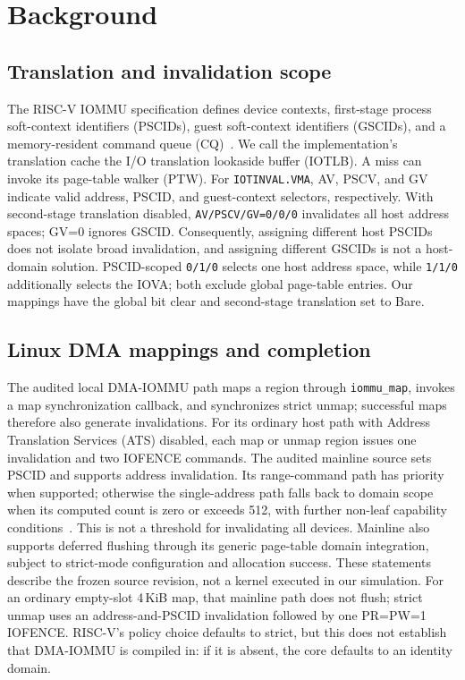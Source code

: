 \documentclass[sigconf,nonacm]{acmart}
\newcommand{\claim}[1]{} %
\begin{document}
\section{Background}
\subsection{Translation and invalidation scope}
The RISC-V IOMMU specification defines device contexts, first-stage process soft-context identifiers (PSCIDs), guest soft-context identifiers (GSCIDs), and a memory-resident command queue (CQ)~\cite{riscv_iommu_spec2026}.\claim{C022}
We call the implementation's translation cache the I/O translation lookaside buffer (IOTLB). A miss can invoke its page-table walker (PTW).\claim{C023}
For \texttt{IOTINVAL.VMA}, AV, PSCV, and GV indicate valid address, PSCID, and guest-context selectors, respectively.\claim{C024}
With second-stage translation disabled, \texttt{AV/PSCV/GV=0/0/0} invalidates all host address spaces; GV=0 ignores GSCID.\claim{C025}
Consequently, assigning different host PSCIDs does not isolate broad invalidation, and assigning different GSCIDs is not a host-domain solution.\claim{C026}
PSCID-scoped \texttt{0/1/0} selects one host address space, while \texttt{1/1/0} additionally selects the IOVA; both exclude global page-table entries.\claim{C027}
Our mappings have the global bit clear and second-stage translation set to Bare.\claim{C028}

\subsection{Linux DMA mappings and completion}
The audited local DMA-IOMMU path maps a region through \texttt{iommu\_map}, invokes a map synchronization callback, and synchronizes strict unmap; successful maps therefore also generate invalidations.\claim{C029}
For its ordinary host path with Address Translation Services (ATS) disabled, each map or unmap region issues one invalidation and two IOFENCE commands.\claim{C030}
The audited mainline source sets PSCID and supports address invalidation. Its range-command path has priority when supported; otherwise the single-address path falls back to domain scope when its computed count is zero or exceeds 512, with further non-leaf capability conditions~\cite{linux_riscv_mainline2026}.\claim{C031}
This is not a threshold for invalidating all devices. Mainline also supports deferred flushing through its generic page-table domain integration, subject to strict-mode configuration and allocation success.\claim{C032}
These statements describe the frozen source revision, not a kernel executed in our simulation.\claim{C033}
For an ordinary empty-slot 4\,KiB map, that mainline path does not flush; strict unmap uses an address-and-PSCID invalidation followed by one PR=PW=1 IOFENCE.\claim{N002}
RISC-V's policy choice defaults to strict, but this does not establish that DMA-IOMMU is compiled in: if it is absent, the core defaults to an identity domain.\claim{N003}
\end{document}
